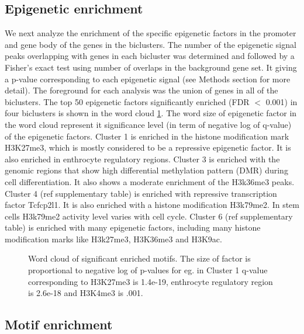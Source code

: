 \documentclass{article}
\begin{document}
\subsection{Epigenetic enrichment}
We next analyze the enrichment of the specific epigenetic factors in the promoter and gene body of the genes in the biclusters. 
The number of the epigenetic signal peaks
overlapping with genes in each bicluster was determined and followed by a Fisher's exact test using number of overlaps in the background gene set. It giving a 
p-value corresponding to each epigenetic signal (see Methods section for more detail). 
The foreground for each
analysis was the union of genes in all of the biclusters.
The top 50 epigenetic factors significantly enriched (FDR $<$ 0.001) in four biclusters is shown in the word cloud \ref{fig:enrich}. The word size of epigenetic factor in
the word cloud represent it significance level (in term of negative log of q-value) of the epigenetic factors. 
Cluster 1 is enriched in the histone modification mark H3K27me3, which is mostly considered to be a repressive epigenetic factor. It is also enriched in enthrocyte
regulatory regions. 
Cluster 3 is enriched with the genomic regions that show high differential methylation pattern (DMR) during cell differentiation. It also shows a moderate
enrichment of the H3k36me3 peaks. 
Cluster 4 (ref supplementary table) is enriched with repressive transcription factor Tcfcp2l1. It is also enriched with a histone modification H3k79me2. In stem cells H3k79me2 activity
level varies with cell cycle. 
Cluster 6 (ref supplementary table) is enriched with many epigenetic factors, including many histone modification marks like H3k27me3, H3K36me3 and H3K9ac.

\begin{figure}[p]
    \begin{adjustwidth}{-1.5in}{-1in}%
	\caption{Word cloud of significant enriched motifs. The size of factor is proportional to negative log of p-values for eg. in Cluster 1  
	    q-value corresponding to H3K27me3 is 1.4e-19, enthrocyte regulatory region is 2.6e-18 and H3K4me3 is .001. 
	}
	\label{fig:enrich}
\end{adjustwidth}
\end{figure}
\subsection{Motif enrichment}
\end{document}
